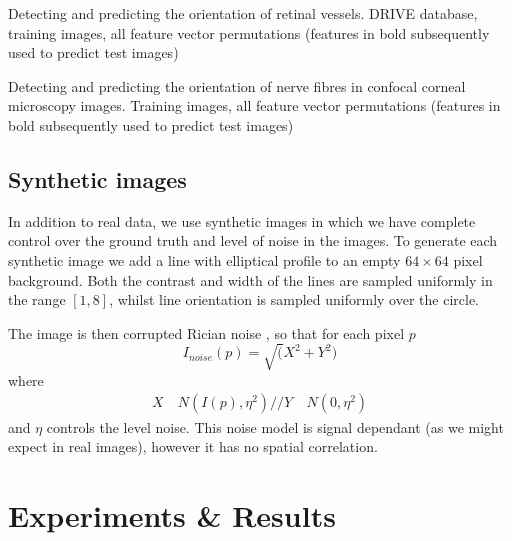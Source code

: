 \documentclass{IEEEtran}
\begin{document}
%
\begin{table}[t]
\centering
\small

\caption{Detecting and predicting the orientation of retinal vessels. DRIVE database, training images, all feature vector permutations (features in bold subsequently used to predict test images)}
\label{t:drive_training_c}
\end{table}
%
\begin{table}[t]
\centering
\small

\caption{Detecting and predicting the orientation of nerve fibres in confocal corneal microscopy images. Training images, all feature vector permutations (features in bold subsequently used to predict test images)}
\label{t:fibre_training_c}
\end{table}

\FloatBarrier

\subsection{Synthetic images}
\label{s:dataset_synthetic}

In addition to real data, we use synthetic images in which we have complete control over the ground truth and level of noise in the images. To generate each synthetic image we add a line with elliptical profile to an empty $64\times64$ pixel background. Both the contrast and width of the lines are sampled uniformly in the range $[1, 8]$, whilst line orientation is sampled uniformly over the circle.

The image is then corrupted Rician noise \cite{}, so that for each pixel $p$
%
\begin{equation}
I_{noise}(p) = \sqrt(X^2 + Y^2)
\label{e:rician_noise}
\end{equation}
%
where
%
\begin{align}
X &~ N(I(p), \eta^2) //
%
Y &~ N(0, \eta^2)
\label{e:rician_noise_uv}
\end{align}
%
and $\eta$ controls the level noise. This noise model is signal dependant (as we might expect in real images), however it has no spatial correlation.

\section{Experiments \& Results}
\label{s:experiments}
\end{document}
